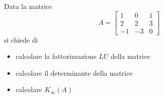 Data la matrice
\bigskip
\[
A=\left[
\begin{array}{ccc}
1 & 0 & 1 \\
2 & 2 & 3\\
-1 & -3 & 0
\end{array}\right]
\]
si chiede di
\begin{itemize}
\item
calcolare la fattorizzazione $LU$ della matrice
\item
calcolare il determinante della matrice
\item
calcolare $K_{\infty}(A)$
\end{itemize}
